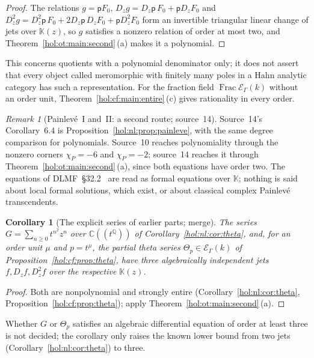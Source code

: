 \documentclass[11pt]{article}
\numberwithin{equation}{section}
\newtheorem{corollary}[theorem]{Corollary}
\theoremstyle{definition}
\theoremstyle{remark}
\newtheorem{remark}[theorem]{Remark}
\newcommand{\C}{\mathbb C}
\newcommand{\Q}{\mathbb Q}
\newcommand{\KK}{\mathbb K}
\newcommand{\EK}{\mathcal E_\Gamma(k)}
\newcommand{\FE}{\operatorname{Frac}\EK}
\begin{document}
\begin{proof}
The relations $g=\mathsf pF_0$, $D_zg=D_z\mathsf p\,F_0+\mathsf pD_zF_0$ and
$D_z^2g=D_z^2\mathsf p\,F_0+2D_z\mathsf p\,D_zF_0+\mathsf pD_z^2F_0$ form an invertible
triangular linear change of jets over $\KK(z)$, so $g$ satisfies a nonzero
relation of order at most two, and Theorem~\ref{hol:ot:main:second}\,(a)
makes it a polynomial.
\end{proof}

This concerns quotients with a polynomial denominator only; it does not
assert that every object called meromorphic with finitely many poles in a
Hahn analytic category has such a representation. For the fraction field $\FE$
without an order unit, Theorem~\ref{hol:cf:main:entire}\,(c) gives rationality
in every order.

\begin{remark}[Painlev\'e~I and~II: a second route; source~14]
\label{hol:ot:rem:painleve}
Source~14's Corollary~6.4 is Proposition~\ref{hol:nl:prop:painleve}, with the
same degree comparison for polynomials. Source~10 reaches polynomiality
through the nonzero corners $\chi_P=-6$ and $\chi_P=-2$; source~14 reaches it
through Theorem~\ref{hol:ot:main:second}\,(a), since both equations have order
two. The equations of DLMF~\S32.2~\cite{dlmfpainleve} are read as formal
equations over $\KK$; nothing is said about local formal solutions, which
exist, or about classical complex Painlev\'e transcendents.
\end{remark}

\begin{corollary}[The explicit series of earlier parts; merge]
\label{hol:ot:cor:examples}
The series $G=\sum_{n\ge0}t^{n^2}z^n$ over $\C((t^\Q))$ of
Corollary~\ref{hol:nl:cor:theta}, and, for an order unit $\mu$ and $p=t^\mu$,
the partial theta series $\Theta_p\in\EK$ of
Proposition~\ref{hol:cf:prop:theta}, have three algebraically independent jets
$f,D_zf,D_z^2f$ over the respective $\KK(z)$.
\end{corollary}

\begin{proof}
Both are nonpolynomial and strongly entire (Corollary~\ref{hol:nl:cor:theta},
Proposition~\ref{hol:cf:prop:theta}); apply
Theorem~\ref{hol:ot:main:second}\,(a).
\end{proof}

Whether $G$ or $\Theta_p$ satisfies an algebraic differential equation of
order at least three is not decided; the corollary only raises the known
lower bound from two jets (Corollary~\ref{hol:nl:cor:theta}) to three.
\end{document}

